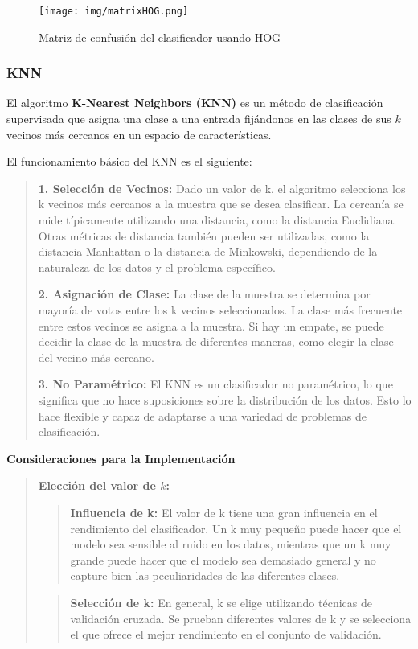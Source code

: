 \documentclass[a4paper, 12pt]{article}
\begin{document}
\begin{figure}[h]
	\centering
	\texttt{[image: img/matrixHOG.png]}
 	\caption{Matriz de confusión del clasificador usando HOG}\vspace{0.5cm}
	\label{fig:normalizacion}
\end{figure}


\subsubsection{KNN}
El algoritmo \textbf{K-Nearest Neighbors (KNN)} es un método de clasificación supervisada que asigna una clase a una entrada fijándonos en las clases de sus $k$ vecinos más cercanos en un espacio de características. 

El funcionamiento básico del KNN es el siguiente:

\begin{quote}
	\textbf{1. Selección de Vecinos:} Dado un valor de k, el algoritmo selecciona los k vecinos más cercanos a la muestra que se desea clasificar. La cercanía se mide típicamente utilizando una distancia, como la distancia Euclidiana. Otras métricas de distancia también pueden ser utilizadas, como la distancia Manhattan o la distancia de Minkowski, dependiendo de la naturaleza de los datos y el problema específico.
	
	\textbf{2. Asignación de Clase:} La clase de la muestra se determina por mayoría de votos entre los k vecinos seleccionados. La clase más frecuente entre estos vecinos se asigna a la muestra. Si hay un empate, se puede decidir la clase de la muestra de diferentes maneras, como elegir la clase del vecino más cercano.
	
	\textbf{3. No Paramétrico:} El KNN es un clasificador no paramétrico, lo que significa que no hace suposiciones sobre la distribución de los datos. Esto lo hace flexible y capaz de adaptarse a una variedad de problemas de clasificación.
	
\end{quote}

\textbf{Consideraciones para la Implementación}

\begin{quote}
	\textbf{Elección del valor de $k$:}
	\begin{quote}
		\textbf{Influencia de k:} El valor de k tiene una gran influencia en el rendimiento del clasificador. Un k muy pequeño puede hacer que el modelo sea sensible al ruido en los datos, mientras que un k muy grande puede hacer que el modelo sea demasiado general y no capture bien las peculiaridades de las diferentes clases.
	\end{quote}
	
	\begin{quote}
		\textbf{Selección de k:} En general, k se elige utilizando técnicas de validación cruzada. Se prueban diferentes valores de k y se selecciona el que ofrece el mejor rendimiento en el conjunto de validación.
	\end{quote}
	
\end{quote}
\end{document}
